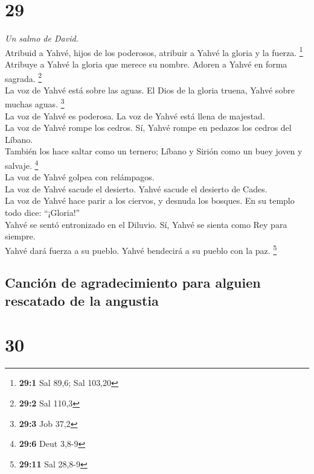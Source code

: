 \hypertarget{section-28}{%
\section{29}\label{section-28}}

\emph{Un salmo de David.}\\
 Atribuid a Yahvé, hijos de los poderosos, atribuir a
Yahvé la gloria y la fuerza. \footnote{\textbf{29:1} Sal 89,6; Sal
  103,20}\\
 Atribuye a Yahvé la gloria que merece su nombre. Adoren a
Yahvé en forma sagrada. \footnote{\textbf{29:2} Sal 110,3}\\
 La voz de Yahvé está sobre las aguas. El Dios de la
gloria truena, Yahvé sobre muchas aguas. \footnote{\textbf{29:3} Job
  37,2}\\
 La voz de Yahvé es poderosa. La voz de Yahvé está llena
de majestad.\\
 La voz de Yahvé rompe los cedros. Sí, Yahvé rompe en
pedazos los cedros del Líbano.\\
 También los hace saltar como un ternero; Líbano y Sirión
como un buey joven y salvaje. \footnote{\textbf{29:6} Deut 3,8-9}\\
 La voz de Yahvé golpea con relámpagos.\\
 La voz de Yahvé sacude el desierto. Yahvé sacude el
desierto de Cades.\\
 La voz de Yahvé hace parir a los ciervos, y desnuda los
bosques. En su templo todo dice: ``¡Gloria!''\\
 Yahvé se sentó entronizado en el Diluvio. Sí, Yahvé se
sienta como Rey para siempre.\\
 Yahvé dará fuerza a su pueblo. Yahvé bendecirá a su
pueblo con la paz. \footnote{\textbf{29:11} Sal 28,8-9}

\hypertarget{canciuxf3n-de-agradecimiento-para-alguien-rescatado-de-la-angustia}{%
\subsection{Canción de agradecimiento para alguien rescatado de la
angustia}\label{canciuxf3n-de-agradecimiento-para-alguien-rescatado-de-la-angustia}}

\hypertarget{section-29}{%
\section{30}\label{section-29}}

